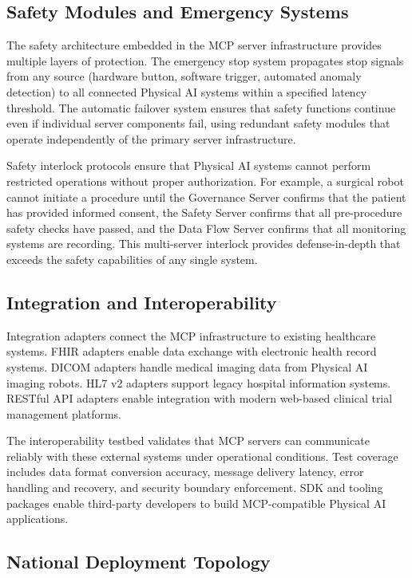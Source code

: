 \subsection{Safety Modules and Emergency Systems}
\label{subsec:mcp-safety}

The safety architecture embedded in the MCP server infrastructure provides
multiple layers of protection. The emergency stop system propagates stop signals
from any source (hardware button, software trigger, automated anomaly
detection) to all connected Physical AI systems within a specified latency
threshold. The automatic failover system ensures that safety functions continue
even if individual server components fail, using redundant safety modules that
operate independently of the primary server infrastructure.

Safety interlock protocols ensure that Physical AI systems cannot perform
restricted operations without proper authorization. For example, a surgical
robot cannot initiate a procedure until the Governance Server confirms that
the patient has provided informed consent, the Safety Server confirms that all
pre-procedure safety checks have passed, and the Data Flow Server confirms that
all monitoring systems are recording. This multi-server interlock provides
defense-in-depth that exceeds the safety capabilities of any single system.

\subsection{Integration and Interoperability}
\label{subsec:mcp-integration}

Integration adapters connect the MCP infrastructure to existing healthcare
systems. FHIR \cite{hl7-fhir} adapters enable data exchange with electronic
health record systems. DICOM \cite{dicom} adapters handle medical imaging data
from Physical AI imaging robots. HL7 v2 adapters support legacy hospital
information systems. RESTful API adapters enable integration with modern
web-based clinical trial management platforms.

The interoperability testbed validates that MCP servers can communicate
reliably with these external systems under operational conditions. Test
coverage includes data format conversion accuracy, message delivery latency,
error handling and recovery, and security boundary enforcement. SDK and
tooling packages enable third-party developers to build MCP-compatible
Physical AI applications.

\subsection{National Deployment Topology}
\label{subsec:mcp-deployment}

